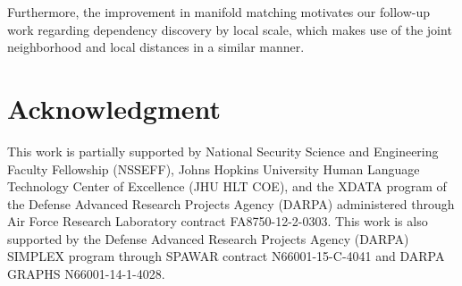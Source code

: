 \documentclass[times,twocolumn,final]{elsarticle}
\begin{document}
Furthermore, the improvement in manifold matching motivates our follow-up work \citep{ShenEtAl2016} regarding dependency discovery by local scale, which makes use of the joint neighborhood and local distances in a similar manner.

\section*{Acknowledgment}
This work is partially supported by National Security Science and Engineering Faculty Fellowship (NSSEFF),
 Johns Hopkins University Human Language Technology Center of Excellence (JHU HLT COE), and the
 XDATA program of the Defense Advanced Research Projects Agency (DARPA) administered through Air Force Research Laboratory contract FA8750-12-2-0303. This work is also supported by the Defense Advanced Research Projects Agency (DARPA) SIMPLEX program through SPAWAR contract N66001-15-C-4041 and DARPA GRAPHS N66001-14-1-4028.





\end{document}
